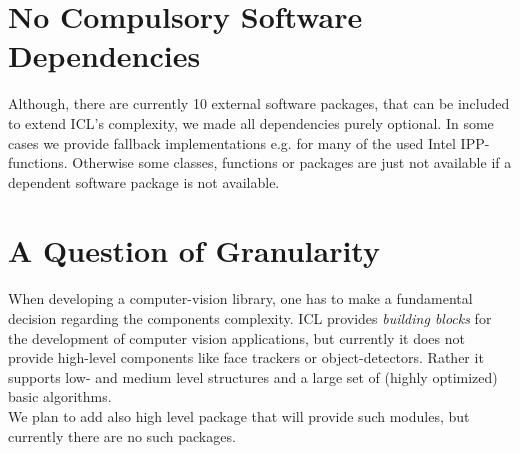  
\section{No Compulsory Software Dependencies}
Although, there are currently 10 external software packages, that can be included to extend ICL's complexity, we made all dependencies purely optional. In some cases we provide fallback implementations e.g. for many of the used Intel IPP-functions. Otherwise some classes, functions or packages are just not available if a dependent software package is not available.

\section{A Question of Granularity}
When developing a computer-vision library, one has to make a fundamental decision regarding the components complexity. ICL provides \emph{building blocks} for the development of computer vision applications, but currently it does not provide high-level components like face trackers or object-detectors. Rather it supports low- and medium level structures and a large set of (highly optimized) basic algorithms.\\
We plan to add also high level package that will provide such modules, but currently there are no such packages.


